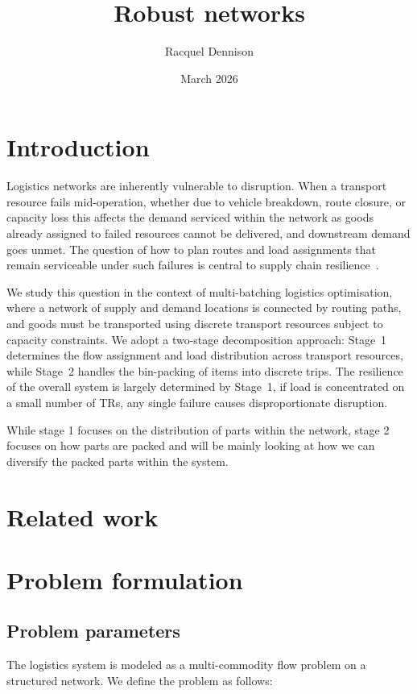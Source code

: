 \documentclass{article}
\title{Robust networks}
\author{Racquel Dennison}
\date{March 2026}
\begin{document}
\maketitle

\section{Introduction}

Logistics networks are inherently vulnerable to disruption. When a
transport resource fails mid-operation, whether due to vehicle
breakdown, route closure, or capacity loss this affects the demand serviced within the network as goods already assigned
to failed resources cannot be delivered, and downstream demand goes
unmet. The question of how to plan routes and load assignments that
remain serviceable under such failures is central to supply chain
resilience~\cite{christopher2004building, tomlin2006value}.

We study this question in the context of multi-batching logistics
optimisation, where a network of supply and demand locations is
connected by routing paths, and goods must be transported using
discrete transport resources subject to capacity constraints.
We adopt a two-stage decomposition approach: Stage~1 determines the
flow assignment and load distribution across transport resources,
while Stage~2 handles the bin-packing of items into discrete trips.
The resilience of the overall system is largely determined by
Stage~1, if load is concentrated on a small number of TRs, any
single failure causes disproportionate disruption.

While stage 1 focuses on the distribution of parts within the network, stage 2 focuses on how parts are packed and will be mainly looking at how we can diversify the packed parts within the system.

\section{Related work}


\section{Problem formulation}
\subsection{Problem parameters}

The logistics system is modeled as a multi-commodity flow problem on a structured network. We define the problem as follows:
\end{document}
